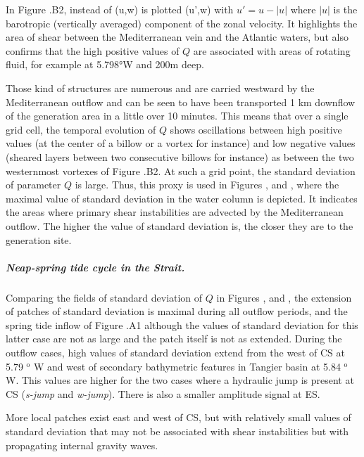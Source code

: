 In Figure .B2, instead of (u,w) is plotted (u',w) with $u'=u-|u|$ where $|u|$ is the \color{red}barotropic (vertically averaged)\color{black} component of the zonal velocity. It highlights the area of shear between the Mediterranean vein and the Atlantic waters, but also confirms that the high positive values of $Q$ are associated with areas of rotating fluid, for example at 5.798°W and 200m deep. 

Those kind of structures are numerous and are carried westward by the Mediterranean outflow \color{red}and can be seen to have been transported 1 km downflow of the generation area in a little over 10 minutes\color{black}. This means that over a single grid cell, the temporal evolution of $Q$ shows oscillations between high positive values (at the center of a billow or a vortex for instance) and low negative values (sheared layers between two consecutive billows for instance) as between the two westernmost vortexes of Figure .B2. At such a grid point, the standard deviation of parameter $Q$ is large. Thus, this proxy is used in Figures ,  and , where the maximal value of standard deviation in the water column is depicted. It indicates the areas where primary shear instabilities are advected by the Mediterranean outflow. The higher the value of standard deviation is, the closer they are to the generation site.

\subparagraph{Neap-spring tide cycle in the Strait.}
Comparing the fields of standard deviation of $Q$ in Figures ,  and , the extension of patches of standard deviation is maximal during all outflow periods, and the spring tide inflow of Figure .A1 although the values of standard deviation for this latter case are not as large and the patch itself is not as extended. During the outflow cases, high values of standard deviation extend from the west of CS at 5.79 $^\text{o}$ W and west of secondary bathymetric features in Tangier basin at 5.84 $^\text{o}$ W. This values are higher for the two cases where a hydraulic jump is present at CS (\textit{s-jump} and \textit{w-jump}). There is also a smaller amplitude signal at ES.

More local patches exist east and west of CS, but with relatively small values of standard deviation that may not be associated with shear instabilities but with propagating internal gravity waves.

